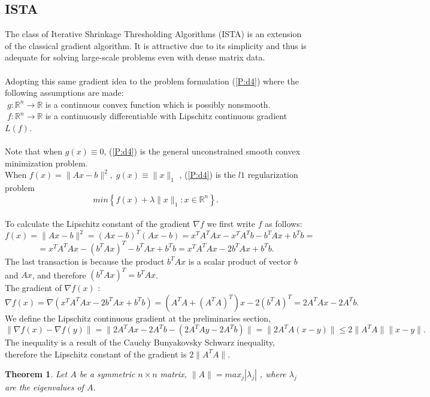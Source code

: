 \documentclass[12pt]{article}
\newtheorem{theorem}{Theorem}
\newenvironment{proof}[1][Proof]{\textbf{#1.} }{\ \rule{0.5em}{0.5em}}
\begin{document}
\subsection{ISTA}
The class of Iterative Shrinkage Thresholding Algorithms (ISTA) is an extension of the classical gradient algorithm. It is attractive due to its simplicity and thus is adequate for solving large-scale problems even with dense matrix data. \\
\\Adopting this same gradient idea to the problem formulation (\ref{P:d4}) where the following assumptions are made:\\
$ \;g: \mathbb{R}^n \rightarrow \mathbb{R}$ is a continuous convex function which is possibly nonsmooth.\\
$ \; f: \mathbb{R}^n \rightarrow \mathbb{R}$ is a continuously differentiable with Lipschitz continuous gradient $L(f)$.\\
\\Note that when $ g(x) \equiv0 $, (\ref{P:d4}) is the general unconstrained smooth convex minimization problem.\\
When $f(x) = \|Ax-b\|^2,\;g(x) \equiv \| x \|_1 $ , (\ref{P:d4}) is the $l1$ regularization problem
$$min\left\{f(x) + \lambda \|x\|_1 : x\in \mathbb{R}^n \right\}.$$
\\To calculate the Lipschitz constant of the gradient $\nabla f$ we first write $f$ as follows:
$$f(x) = \|Ax-b\|^2 = (Ax-b)^T (Ax-b)= x^T A^T Ax -x^T A^T b -b^T Ax +b^T b =$$
$$=x^T A^T Ax -(b^T Ax)^T -b^T Ax +b^T b= x^T A^T Ax -2b^T Ax +b^T b.$$
The last transaction is because the product $b^T Ax$ is a scalar product of vector $b$ and $Ax$, and therefore $(b^T Ax)^T=b^T Ax$.\\
The gradient of $\nabla f(x)$ :
$$\nabla f(x) = \nabla(x^T A^T Ax -2b^T Ax +b^T b)=(A^TA +(A^TA)^T)x-2(b^T A)^T =2A^TA x -2A^T b.$$
We define the Lipschitz continuous gradient at the preliminaries section, 
$$\| \nabla f(x) - \nabla f(y) \|= \| 2A^TA x -2A^T b-(2A^TA y -2A^T b)\| = \|2A^TA(x-y)\| \leq 2\|A^TA\| \|x-y\|.$$
The inequality is a result of the Cauchy Bunyakovsky Schwarz inequality, therefore the Lipschitz constant of the gradient is $2\|A^TA\|$. 
\begin{theorem}
Let $A$ be a symmetric $n\times n$ matrix, $\|A\|=max_j|\lambda_j|$ , where $\lambda_j$ are the eigenvalues of $A$.
\end{theorem}
\end{document}
